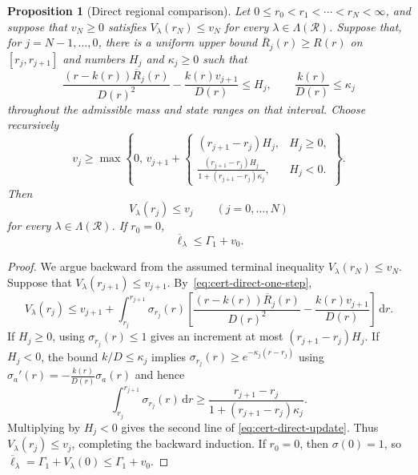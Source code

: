 \documentclass[11pt]{article}
\newtheorem{proposition}[theorem]{Proposition}
\theoremstyle{definition}
\theoremstyle{remark}
\newcommand{\dd}{\,\mathrm d}
\begin{document}
\begin{proposition}[Direct regional comparison]
\label{prop:cert-direct}
Let $0\le r_0<r_1<\cdots<r_N<\infty$, and suppose that
$v_N\ge0$ satisfies $V_\lambda(r_N)\le v_N$ for every
$\lambda\in\Lambda(\mathcal R)$.  Suppose that, for
$j=N-1,\ldots,0$, there is a uniform upper bound
$\overline R_j(r)\ge R(r)$ on $[r_j,r_{j+1}]$ and numbers
$H_j$ and $\kappa_j\ge0$ such that
\begin{equation}\label{eq:cert-direct-residual}
 \frac{(r-k(r))\overline R_j(r)}{D(r)^2}
 -\frac{k(r)v_{j+1}}{D(r)}
 \le H_j,
 \qquad
 \frac{k(r)}{D(r)}\le \kappa_j
\end{equation}
throughout the admissible mass and state ranges on that interval.
Choose recursively
\begin{equation}\label{eq:cert-direct-update}
 v_j\ge
 \max\left\{0,\,
 v_{j+1}+
 \begin{cases}
 (r_{j+1}-r_j)H_j,
     &H_j\ge0,\\[2mm]
 \displaystyle
 \frac{(r_{j+1}-r_j)H_j}
 {1+(r_{j+1}-r_j)\kappa_j},
     &H_j<0.
 \end{cases}
 \right\}.
\end{equation}
Then
\[
 V_\lambda(r_j)\le v_j
 \qquad
 (j=0,\ldots,N)
\]
for every $\lambda\in\Lambda(\mathcal R)$.  If $r_0=0$,
\begin{equation}\label{eq:cert-direct-result}
 \overline\ell_\lambda
 \le \Gamma_1+v_0.
\end{equation}
\end{proposition}

\begin{proof}
We argue backward from the assumed terminal inequality
$V_\lambda(r_N)\le v_N$.  Suppose that
$V_\lambda(r_{j+1})\le v_{j+1}$.  By~\eqref{eq:cert-direct-one-step},
\[
 V_\lambda(r_j)\le v_{j+1}
 +\int_{r_j}^{r_{j+1}}\sigma_{r_j}(r)
 \left[
 \frac{(r-k(r))\overline R_j(r)}{D(r)^2}
 -\frac{k(r)v_{j+1}}{D(r)}
 \right]\dd r.
\]
If $H_j\ge0$, using $\sigma_{r_j}(r)\le1$ gives an increment at most
$(r_{j+1}-r_j)H_j$. If $H_j<0$, the bound $k/D\le \kappa_j$ implies $\sigma_{r_j}(r)\ge e^{-\kappa_j(r-r_j)}$ using $\sigma_a'(r)=-\frac{k(r)}{D(r)}\sigma_a(r)$
and hence
\[
 \int_{r_j}^{r_{j+1}}\sigma_{r_j}(r)\dd r
 \ge
 \frac{r_{j+1}-r_j}
 {1+(r_{j+1}-r_j)\kappa_j}.
\]
Multiplying by $H_j<0$ gives the second line of
\eqref{eq:cert-direct-update}.  Thus
$V_\lambda(r_j)\le v_j$, completing the backward induction. If $r_0=0$, then $\sigma(0)=1$, so
$
 \overline\ell_\lambda
 =\Gamma_1+V_\lambda(0)
 \le\Gamma_1+v_0$.
\end{proof}
\end{document}
